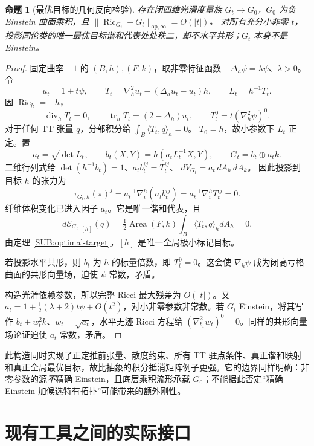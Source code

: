 \documentclass[UTF8,fontset=fandol,zihao=-4,oneside,openany]{ctexbook}
\theoremstyle{cjkplain}
\newtheorem{proposition}[theorem]{命题}
\numberwithin{equation}{chapter}
\begin{document}
\begin{proposition}[最优目标的几何反向检验]\label{SUB:optimal-nonconformal}
存在闭四维光滑度量族 $G_t\to G_0$，$G_0$ 为负 Einstein 曲面乘积，且
$\|\operatorname{Ric}_{G_t}+G_t\|_{\mathrm{op},\infty}=O(|t|)$。
对所有充分小非零 $t$，投影同伦类的唯一最优目标谐和代表处处秩二，却不水平共形；$G_t$ 本身不是 Einstein。
\end{proposition}
\begin{proof}
固定曲率 $-1$ 的 $(B,h),(F,k)$，取非零特征函数
$-\Delta_h\psi=\lambda\psi$、$\lambda>0$。令
\begin{equation}\label{SUB:optimal-tensor}
 u_t=1+t\psi,\qquad
 T_t=\nabla_h^2u_t-(\Delta_hu_t-u_t)h,\qquad L_t=h^{-1}T_t.
\end{equation}
因 $\operatorname{Ric}_h=-h$，
\[
\operatorname{div}_hT_t=0,\qquad
\operatorname{tr}_hT_t=(2-\Delta_h)u_t,\qquad
T_t^0=t(\nabla_h^2\psi)^0.
\]
对于任何 TT 张量 $q$，分部积分给 $\int_B\langle T_t,q\rangle_h=0$。
$T_0=h$，故小参数下 $L_t$ 正定。置
\begin{equation}\label{SUB:optimal-metric}
a_t=\sqrt{\det L_t},\qquad
 b_t(X,Y)=h(a_tL_t^{-1}X,Y),\qquad
 G_t=b_t\oplus a_tk.
\end{equation}
二维行列式给
$\det(h^{-1}b_t)=1$、$a_tb_t^{ij}=T_t^{ij}$、
$dV_{G_t}=a_t\,dA_h\,dA_k$。
因此投影到目标 $h$ 的张力为
\[
\tau_{G_t,h}(\pi)^j
=a_t^{-1}\nabla_i^h(a_tb_t^{ij})
=a_t^{-1}\nabla_i^hT_t^{ij}=0.
\]
纤维体积变化已进入因子 $a_t$。它是唯一谐和代表，且
\[
d\mathcal E_{G_t}|_{[h]}(q)
=\tfrac12\operatorname{Area}(F,k)\int_B\langle T_t,q\rangle_h dA_h=0.
\]
由定理 \ref{SUB:optimal-target}，$[h]$ 是唯一全局极小标记目标。

若投影水平共形，则 $b_t$ 为 $h$ 的标量倍数，即 $T_t^0=0$。这会使
$\nabla_h\psi$ 成为闭高亏格曲面的共形向量场，迫使 $\psi$ 常数，矛盾。

构造光滑依赖参数，所以完整 Ricci 最大残差为 $O(|t|)$。又
$a_t=1+\tfrac12(\lambda+2)t\psi+O(t^2)$，对小非零参数非常数。若 $G_t$ Einstein，将其写作 $b_t+w_t^2k$、$w_t=\sqrt{a_t}$，水平无迹 Ricci 方程给
$(\nabla_{b_t}^2w_t)^0=0$。同样的共形向量场论证迫使 $a_t$ 常数，矛盾。
\end{proof}

此构造同时实现了正定推前张量、散度约束、所有 TT 驻点条件、真正谐和映射和真正全局最优目标，故比抽象的积分抵消矩阵例子更强。它的边界同样明确：非零参数的源\emph{不}精确 Einstein，且底层乘积流形承载 $G_0$；不能据此否定“精确 Einstein 加候选特有拓扑”可能带来的额外刚性。

\section{现有工具之间的实际接口}
\end{document}

